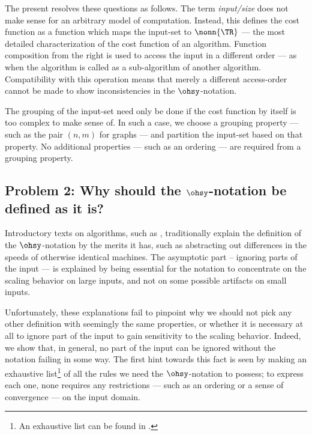 \documentclass[b5paper, english, oneside]{memoir}
\begin{document}
The present \manuscript{} resolves these questions as follows. The term \emph{input\-/size} does not make sense for an arbitrary model of computation. Instead, this \manuscript{} defines the cost function as a function which maps the input-set to $\nonn{\TR}$ --- the most detailed characterization of the cost function of an algorithm. Function composition from the right is used to access the input in a different order --- as when the algorithm is called as a sub-algorithm of another algorithm. Compatibility with this operation means that merely a different access-order cannot be made to show inconsistencies in the $\ohsy$-notation. 

The grouping of the input-set need only be done if the cost function by itself is too complex to make sense of. In such a case, we choose a grouping property --- such as the pair $(n, m)$ for graphs --- and partition the input-set based on that property. No additional properties --- such as an ordering --- are required from a grouping property.

\subsection{Problem 2: Why should the \texorpdfstring{$\ohsy$}{O}-notation be defined as it is?}

Introductory texts on algorithms, such as \cite{IntroAlgo}, traditionally explain the definition of the $\ohsy$-notation by the merits it has, such as abstracting out differences in the speeds of otherwise identical machines. The asymptotic part -- ignoring parts of the input --- is explained by being essential for the notation to concentrate on the scaling behavior on large inputs, and not on some possible artifacts on small inputs. 

Unfortunately, these explanations fail to pinpoint why we should not pick any other definition with seemingly the same properties, or whether it is necessary at all to ignore part of the input to gain sensitivity to the scaling behavior. Indeed, we show that, in general, no part of the input can be ignored without the notation failing in some way. The first hint towards this fact is seen by making an exhaustive list\footnote{An exhaustive list can be found in .} of all the rules we need the $\ohsy$-notation to possess; to express each one, none requires any restrictions --- such as an ordering or a sense of convergence --- on the input domain. 
\end{document}
